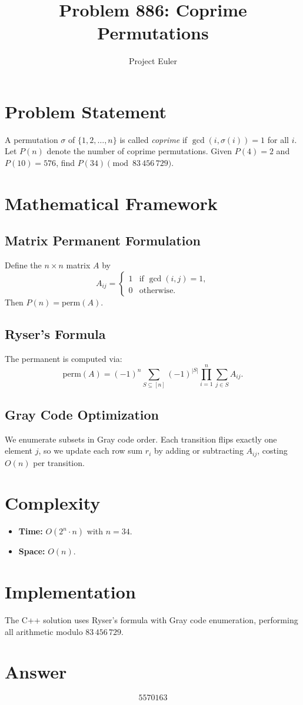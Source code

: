 \documentclass[12pt]{article}
\title{Problem 886: Coprime Permutations}
\author{Project Euler}
\date{}
\begin{document}
\maketitle

\section{Problem Statement}
A permutation $\sigma$ of $\{1,2,\ldots,n\}$ is called \emph{coprime} if $\gcd(i,\sigma(i))=1$ for all $i$. Let $P(n)$ denote the number of coprime permutations. Given $P(4)=2$ and $P(10)=576$, find $P(34) \pmod{83\,456\,729}$.

\section{Mathematical Framework}

\subsection{Matrix Permanent Formulation}
Define the $n\times n$ matrix $A$ by
\[
A_{ij} = \begin{cases} 1 & \text{if } \gcd(i,j)=1, \\ 0 & \text{otherwise.} \end{cases}
\]
Then $P(n) = \mathrm{perm}(A)$.

\subsection{Ryser's Formula}
The permanent is computed via:
\[
\mathrm{perm}(A) = (-1)^n \sum_{S \subseteq [n]} (-1)^{|S|} \prod_{i=1}^{n} \sum_{j\in S} A_{ij}.
\]

\subsection{Gray Code Optimization}
We enumerate subsets in Gray code order. Each transition flips exactly one element $j$, so we update each row sum $r_i$ by adding or subtracting $A_{ij}$, costing $O(n)$ per transition.

\section{Complexity}
\begin{itemize}
\item \textbf{Time:} $O(2^n \cdot n)$ with $n=34$.
\item \textbf{Space:} $O(n)$.
\end{itemize}

\section{Implementation}
The C++ solution uses Ryser's formula with Gray code enumeration, performing all arithmetic modulo $83\,456\,729$.

\section{Answer}

\[
\boxed{5570163}
\]
\end{document}
